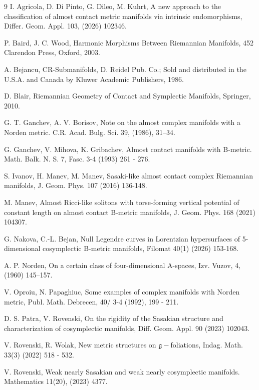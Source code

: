 \documentclass{article}
\begin{document}
\begin{thebibliography}{9}
	 I. Agricola, D. Di Pinto, G. Dileo, M. Kuhrt, A new approach to the classification of almost contact metric manifolds via intrinsic endomorphisms, Differ. Geom. Appl. 103, (2026) 102346.
	
	  P. Baird, J. C. Wood, Harmonic Morphisms Between Riemannian Manifolds, 452 Clarendon Press, Oxford, 2003.
	
	 A. Bejancu, CR-Submanifolds, D. Reidel Pub. Co.; Sold and distributed in the U.S.A. and Canada by Kluwer Academic Publishers, 1986.
	
	 D. Blair, Riemannian Geometry of Contact and Symplectic Manifolds, Springer, 2010.
	
	 G. T. Ganchev, A. V. Borisov, Note on the almost complex manifolds with a Norden metric. C.R. Acad. Bulg. Sci. 39, (1986), 31–34.
	
	 G. Ganchev, V. Mihova, K. Gribachev, Almost contact manifolds with B-metric. Math. Balk. N. S. 7, Fasc. 3-4 (1993) 261 - 276.
	
	 S. Ivanov, H. Manev, M. Manev, Sasaki-like almost contact complex Riemannian manifolds, J. Geom. Phys. 107 (2016) 136-148.
	
	 M. Manev, Almost Ricci-like solitons with torse-forming vertical potential of constant length on almost contact B-metric manifolds, J. Geom. Phys. 168 (2021) 104307.
	
	 G. Nakova, C.-L. Bejan, Null Legendre curves in Lorentzian hypersurfaces of 5-dimensional cosymplectic B-metric manifolds, Filomat 40(1) (2026) 153-168.
	
	 A. P. Norden, On a certain class of four-dimensional A-spaces, Izv. Vuzov, 4, (1960) 145–157.
	
	 V. Oproiu, N. Papaghiuc, Some examples of complex manifolds with Norden metric, Publ. Math. Debrecen, 40/ 3-4 (1992), 199 - 211.
	
	 D. S. Patra, V. Rovenski, On the rigidity of the Sasakian structure and characterization of cosymplectic manifolds, Diff. Geom. Appl. 90 (2023) 102043.
	
	 V. Rovenski, R. Wolak, New metric structures on $\mathfrak{g}-$foliations, Indag. Math. 33(3) (2022) 518 - 532. 
	
	 V. Rovenski, Weak nearly Sasakian and weak nearly cosymplectic manifolds. Mathematics 11(20), (2023) 4377.
	

\end{thebibliography}
\end{document}
